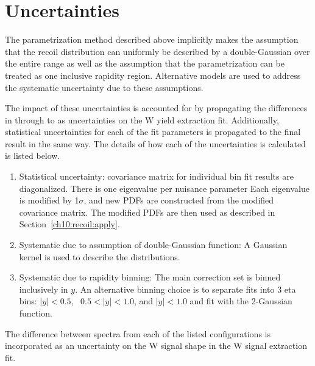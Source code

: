 
\section{Uncertainties}\label{ch:recoil:unc}
The parametrization method described above implicitly makes the assumption that the recoil distribution can uniformly be described by a double-Gaussian over the entire \pt range as well as the assumption that the parametrization can be treated as one inclusive rapidity region. Alternative models are used to address the systematic uncertainty due to these assumptions. 

The impact of these uncertainties is accounted for by propagating the differences in \met through \mt to as uncertainties on the W yield extraction fit. Additionally, statistical uncertainties for each of the fit parameters is propagated to the final result in the same way.
The details of how each of the uncertainties is calculated is listed below.
\begin{enumerate}
    \item Statistical uncertainty: covariance matrix for individual bin fit results are diagonalized. There is one eigenvalue per nuisance parameter Each eigenvalue is modified by 1$\sigma$, and new PDFs are constructed from the modified covariance matrix. The modified PDFs are then used as described in Section~\ref{ch10:recoil:apply}. 
    \item Systematic due to assumption of double-Gaussian function: A Gaussian kernel is used to describe the distributions. 
    \item Systematic due to rapidity binning: The main correction set is binned inclusively in $y$. An alternative binning choice is to separate fits into 3 eta bins: $|y|<0.5$,~ $0.5 <  |y| < 1.0$, and $|y| < 1.0$ and fit with the 2-Gaussian function. 
\end{enumerate}
 
The difference between \met spectra from each of the listed configurations is incorporated as an uncertainty on the W signal shape in the W signal extraction fit.